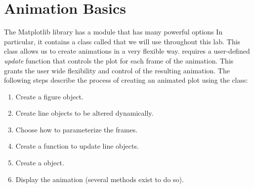 \section*{Animation Basics}
The Matplotlib library has a module  that has many powerful options
In particular, it contains a class called  that we will use throughout this lab. 
This class allows us to create animations in a very flexible way.
 requires a user-defined \textit{update} function that controls the plot for each frame of the animation. 
This grants the user wide flexibility and control of the resulting animation.
The following steps describe the process of creating an animated plot using the  class:
\begin{enumerate}
\item Create a figure object.
\item Create line objects to be altered dynamically.
\item Choose how to parameterize the frames.
\item Create a function to update line objects.
\item Create a  object.
\item Display the animation (several methods exist to do so).
\end{enumerate}


